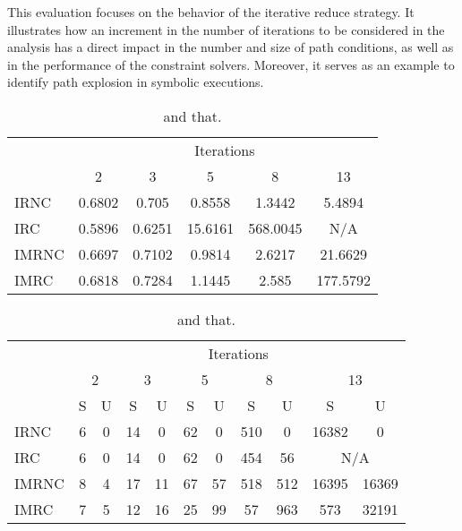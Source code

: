 
This evaluation focuses on the behavior of the iterative reduce strategy. It illustrates how an increment in the number of iterations to be considered in the analysis has a direct impact in the number and size of path conditions, as well as in the performance of the constraint solvers. Moreover, it serves as an example to identify path explosion in symbolic executions.

\begin{table}[t]
	\centering
	\large
	\begin{tabular}{l||ccccc}
		& \multicolumn{5}{c}{Iterations} \\		
		& 2 & 3 & 5 & 8 & 13 \\
		\hline
		IRNC  & 0.6802 & 0.705  & 0.8558  & 1.3442   & 5.4894   \\
		IRC   & 0.5896 & 0.6251 & 15.6161 & 568.0045 & N/A      \\
		IMRNC & 0.6697 & 0.7102 & 0.9814  & 2.6217   & 21.6629  \\
		IMRC  & 0.6818 & 0.7284 & 1.1445  & 2.585    & 177.5792 \\		
	\end{tabular}	
	\caption[This]{and that.}
	\label{tab:evaluation:quantitative-time}
\end{table}

\begin{table}[t]
	\centering
	\large
	\begin{tabular}{l||cccccccccc}
		& \multicolumn{10}{c}{Iterations} \\		
		& \multicolumn{2}{c}{2} & \multicolumn{2}{c}{3} & \multicolumn{2}{c}{5} & \multicolumn{2}{c}{8} & \multicolumn{2}{c}{13} \\
		& S & U & S & U & S & U & S & U & S & U \\		
		\hline
		IRNC   & 6 & 0 & 14 & 0  & 62 & 0  & 510 & 0   & 16382 & 0               \\
		IRC    & 6 & 0 & 14 & 0  & 62 & 0  & 454 & 56  & \multicolumn{2}{c}{N/A} \\
		IMRNC  & 8 & 4 & 17 & 11 & 67 & 57 & 518 & 512 & 16395 & 16369           \\
		IMRC   & 7 & 5 & 12 & 16 & 25 & 99 & 57  & 963 & 573   & 32191           \\		
	\end{tabular}
	\caption[This]{and that.}
	\label{tab:evaluation:quantitative-path-conditions}
\end{table} 